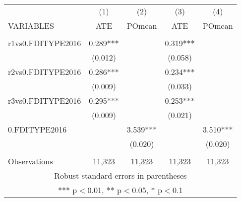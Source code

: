 \documentclass[]{article}
\begin{document}
\begin{tabular}{lcccc} \hline
 & (1) & (2) & (3) & (4) \\
VARIABLES & ATE & POmean & ATE & POmean \\ \hline
 &  &  &  &  \\
r1vs0.FDITYPE2016 & 0.289*** &  & 0.319*** &  \\
 & (0.012) &  & (0.058) &  \\
r2vs0.FDITYPE2016 & 0.286*** &  & 0.234*** &  \\
 & (0.009) &  & (0.033) &  \\
r3vs0.FDITYPE2016 & 0.295*** &  & 0.253*** &  \\
 & (0.009) &  & (0.021) &  \\
0.FDITYPE2016 &  & 3.539*** &  & 3.510*** \\
 &  & (0.020) &  & (0.020) \\
 &  &  &  &  \\
 Observations & 11,323 & 11,323 & 11,323 & 11,323 \\ \hline
\multicolumn{5}{c}{ Robust standard errors in parentheses} \\
\multicolumn{5}{c}{ *** p$<$0.01, ** p$<$0.05, * p$<$0.1} \\
\end{tabular}
\end{document}
